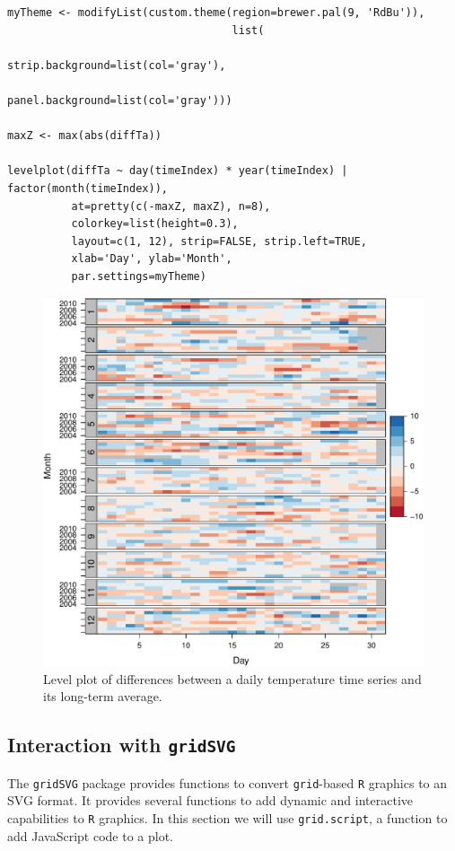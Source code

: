 \documentclass[smallroyalvopaper]{memoir}
\begin{document}
\lstset{language=R,numbers=none}
\begin{lstlisting}
myTheme <- modifyList(custom.theme(region=brewer.pal(9, 'RdBu')),
                                   list(
                                     strip.background=list(col='gray'),
                                     panel.background=list(col='gray')))

maxZ <- max(abs(diffTa))

levelplot(diffTa ~ day(timeIndex) * year(timeIndex) | factor(month(timeIndex)),
          at=pretty(c(-maxZ, maxZ), n=8),
          colorkey=list(height=0.3),
          layout=c(1, 12), strip=FALSE, strip.left=TRUE,
          xlab='Day', ylab='Month', 
          par.settings=myTheme)
\end{lstlisting}

\begin{figure}[htb]
\centering
\includegraphics[width=.9\linewidth]{figs/diffTa_levelplot.pdf}
\caption{\label{fig:diffTa_level}Level plot of differences between a daily temperature time series and its long-term average.}
\end{figure}

\subsection{\floweroneleft Interaction with \texttt{gridSVG}}
\label{sec-2-4}
The \texttt{gridSVG} package provides functions to convert \texttt{grid}-based \texttt{R}
graphics to an SVG format. It provides several functions to add
dynamic and interactive capabilities to \texttt{R} graphics. In this section
we will use \texttt{grid.script}, a function to add JavaScript code to a
plot.
\end{document}
